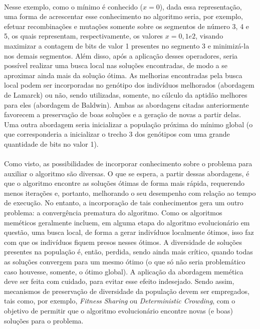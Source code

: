 \documentclass{report}
\begin{document}
\paragraph{} Nesse exemplo, como o mínimo é conhecido ($x = 0$), dada essa representação, uma forma de acrescentar esse conhecimento no algoritmo seria, por exemplo, efetuar recombinações e mutações somente sobre os segmentos de número 3, 4 e 5, os quais representam, respectivamente, os valores $x = 0, 1 e 2$, visando maximizar a contagem de bits de valor 1 presentes no segmento 3 e minimizá-la nos demais segmentos. Além disso, após a aplicação desses operadores, seria possível realizar uma busca local nas soluções encontradas, de modo a se aproximar ainda mais da solução ótima. As melhorias encontradas pela busca local podem ser incorporadas no genótipo dos indivíduos melhorados (abordagem de Lamarck) ou não, sendo utilizadas, somente, no cálculo da aptidão melhores para eles (abordagem de Baldwin). Ambas as abordagens citadas anteriormente favorecem a preservação de boas soluções e a geração de novas a partir delas. Uma outra abordagem seria inicializar a população próxima do mínimo global (o que corresponderia a inicializar o trecho 3 dos genótipos com uma grande quantidade de bits no valor 1).\\

\paragraph{} Como visto, as possibilidades de incorporar conhecimento sobre o problema para auxiliar o algoritmo são diversas. O que se espera, a partir dessas abordagens, é que o algoritmo encontre as soluções ótimas de forma mais rápida, requerendo menos iterações e, portanto, melhorando o seu desempenho com relação ao tempo de execução. No entanto, a incorporação de tais conhecimentos gera um outro problema: a convergência prematura do algoritmo. Como os algoritmos meméticos geralmente incluem, em alguma etapa do algoritmo evolucionário em questão, uma busca local, de forma a gerar indivíduos localmente ótimos, isso faz com que os indivíduos fiquem presos nesses ótimos. A diversidade de soluções presentes na população é, então, perdida, sendo ainda mais crítico, quando todas as soluções convergem para um mesmo ótimo (o que só não seria problemático caso houvesse, somente, o ótimo global). A aplicação da abordagem memética deve ser feita com cuidado, para evitar esse efeito indesejado. Sendo assim, mecanismos de preservação de diversidade da população devem ser empregados, tais como, por exemplo, \textit{Fitness Sharing} ou \textit{Deterministic Crowding}, com o objetivo de permitir que o algoritmo evolucionário encontre novas (e boas) soluções para o problema.\\
\end{document}
